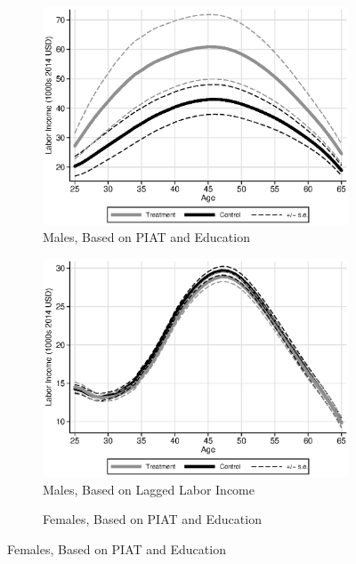 \setcounter{figure}{4}
\begin{figure}
\centering
\caption{Forecasted Labor Income Profiles for ABC/CARE Participants}\label{fig:labor-income-profilessens}
\begin{subfigure}[h]{0.35\textwidth}
		\centering
		\caption{Males, Based on PIAT and Education}
		\includegraphics[width=\textwidth]{output/labor_25-60_male_2}
\end{subfigure}%
\begin{subfigure}[h]{0.35\textwidth}
		\centering
		\caption{Males, Based on Lagged Labor Income}
		\includegraphics[width=\textwidth]{output/labor_25-60_male_3}
\end{subfigure}
\begin{subfigure}[h]{0.35\textwidth}
		\centering
		\caption{Females, Based on PIAT and Education}

\end{subfigure}
\end{figure}
